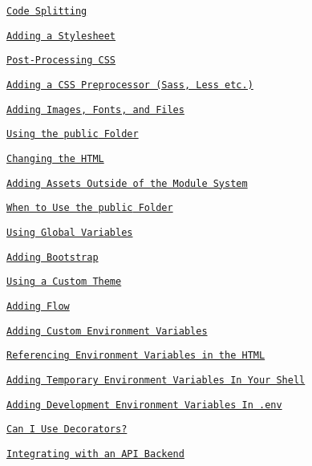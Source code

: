 \begin{DoxyItemize}
\item \href{#code-splitting}{\tt Code Splitting}
\item \href{#adding-a-stylesheet}{\tt Adding a Stylesheet}
\item \href{#post-processing-css}{\tt Post-\/\+Processing C\+SS}
\item \href{#adding-a-css-preprocessor-sass-less-etc}{\tt Adding a C\+SS Preprocessor (Sass, Less etc.)}
\item \href{#adding-images-fonts-and-files}{\tt Adding Images, Fonts, and Files}
\item \href{#using-the-public-folder}{\tt Using the {\ttfamily public} Folder}
\begin{DoxyItemize}
\item \href{#changing-the-html}{\tt Changing the H\+T\+ML}
\item \href{#adding-assets-outside-of-the-module-system}{\tt Adding Assets Outside of the Module System}
\item \href{#when-to-use-the-public-folder}{\tt When to Use the {\ttfamily public} Folder}
\end{DoxyItemize}
\item \href{#using-global-variables}{\tt Using Global Variables}
\item \href{#adding-bootstrap}{\tt Adding Bootstrap}
\begin{DoxyItemize}
\item \href{#using-a-custom-theme}{\tt Using a Custom Theme}
\end{DoxyItemize}
\item \href{#adding-flow}{\tt Adding Flow}
\item \href{#adding-custom-environment-variables}{\tt Adding Custom Environment Variables}
\begin{DoxyItemize}
\item \href{#referencing-environment-variables-in-the-html}{\tt Referencing Environment Variables in the H\+T\+ML}
\item \href{#adding-temporary-environment-variables-in-your-shell}{\tt Adding Temporary Environment Variables In Your Shell}
\item \href{#adding-development-environment-variables-in-env}{\tt Adding Development Environment Variables In {\ttfamily .env}}
\end{DoxyItemize}
\item \href{#can-i-use-decorators}{\tt Can I Use Decorators?}
\item \href{#integrating-with-an-api-backend}{\tt Integrating with an A\+PI Backend}

\end{DoxyItemize}
